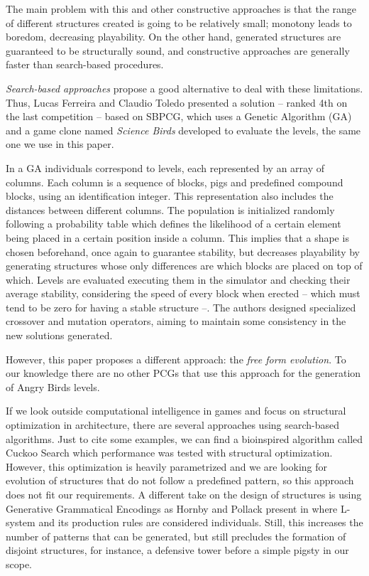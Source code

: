 \documentclass[sigconf]{acmart}
\begin{document}
The main problem with this and other constructive approaches is that 
the range of different structures created is going to be relatively small; monotony
leads to boredom, decreasing playability. On the other hand, generated
structures are guaranteed to be structurally sound, and constructive
approaches are generally faster than search-based procedures.

\textit{Search-based approaches} propose a good alternative to deal
with these limitations. Thus, Lucas Ferreira and Claudio Toledo
\cite{ferreira2014search} presented a solution -- ranked 4th on the
last competition -- based on SBPCG, which uses a Genetic Algorithm
(GA) and a game clone named \textit{Science Birds} developed to
evaluate the levels, the same one we use in this paper.

In a GA individuals correspond to levels, each represented by an array
of columns. Each column is a sequence of blocks, pigs and predefined
compound blocks, using an identification integer. This representation
also includes the distances between different columns. The population
is initialized randomly following a probability table which defines
the likelihood of a certain element being placed in a certain position
inside a column. This implies that a shape is chosen beforehand, once
again to guarantee stability, but decreases playability by generating
structures whose only differences are which blocks are placed on top
of which.  Levels are evaluated executing them in the simulator and
checking their average stability, considering the speed of every block
when erected -- which must tend to be zero for having a stable
structure --. The authors designed specialized crossover and mutation
operators, aiming to maintain some consistency in the new solutions
generated.

However, this paper proposes a different approach: the \textit{free
  form evolution}. To our knowledge there are no other PCGs that
use this approach for the generation of Angry Birds levels. 

If we look outside computational intelligence in games and focus on 
structural optimization in architecture, there are several approaches using search-based
algorithms. Just to cite some examples, we can find a bioinspired algorithm called Cuckoo Search \cite{gandomi2013cuckoo}
which performance was tested with structural optimization. However, this optimization is heavily parametrized
and we are looking for evolution of structures that do not follow a predefined pattern, so this approach does not fit our requirements. A different take on the design of structures is using Generative Grammatical 
Encodings as Hornby and Pollack present in \cite{hornby2001advantages} where L-system
and its production rules are considered individuals. Still, this increases the
number of patterns that can be generated, but still precludes the formation 
of disjoint structures, for instance, a defensive tower before a simple pigsty in our scope.
\end{document}
